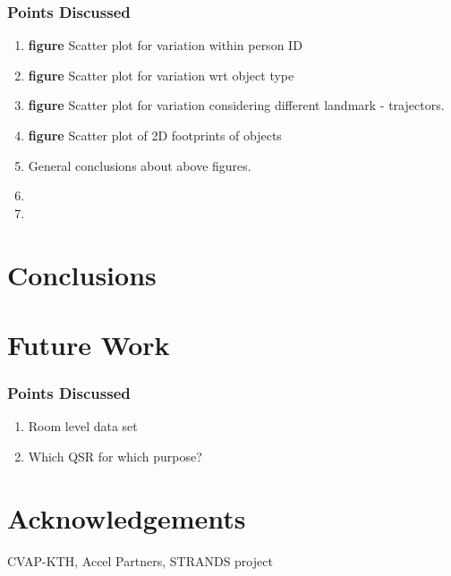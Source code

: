 \documentclass[letterpaper, 10 pt, conference]{ieeeconf}  %
\begin{document}
\subsubsection*{Points Discussed}
\begin{enumerate}
	\item \textbf{figure} Scatter plot for variation within person ID
	\item \textbf{figure} Scatter plot for variation wrt object type
	\item \textbf{figure} Scatter plot for variation considering different landmark - trajectors.
	\item \textbf{figure} Scatter plot of 2D footprints of objects
	\item General conclusions about above figures.
	\item 
	\item 
\end{enumerate}

\section{Conclusions}
\label{sec:Conclusions}

\section{Future Work}
\label{sec:Future Work}

\subsubsection*{Points Discussed}
\begin{enumerate}
	\item Room level data set
	\item Which QSR for which purpose?
\end{enumerate}

\section{Acknowledgements}
\label{sec:Acknowledgements}
CVAP-KTH, Accel Partners, STRANDS project



\end{document}
